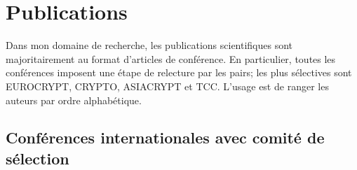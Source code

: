 \documentclass[11pt]{article}
\begin{document}


\section{Publications}

Dans mon domaine de recherche, les publications scientifiques sont majoritairement au format d'articles de conférence.
En particulier, toutes les conférences imposent une étape de relecture par les pairs; les plus sélectives sont EUROCRYPT, CRYPTO, ASIACRYPT et TCC.
L'usage est de ranger les auteurs par ordre alphabétique.

\subsection*{Conférences internationales avec comité de sélection}
\end{document}

